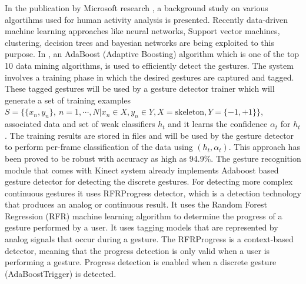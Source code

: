 In the publication by Microsoft research \cite{han2013enhanced}, a background study on various algortihms used for human activity analysis is presented. Recently \cite{KinectSDK2014} data-driven machine learning approaches like neural networks, Support vector machines, clustering, decision trees and bayesian networks are being exploited to this purpose. In \cite{KinectSDK2014}, an AdaBoost (Adaptive Boosting) algorithm \cite{freund1997decision} which is one of the top 10 data mining algorithms, is used to efficiently detect the gestures. The system involves a training phase in which the desired gestures are captured and tagged. These tagged gestures will be used by a gesture detector trainer which will generate a set of training examples $S=\lbrace \lbrace x_n,y_n \rbrace,\ n=1,\cdots,N \vert x_n\in X,y_n\in Y, X=\text{skeleton},Y=\lbrace -1,+1 \rbrace\rbrace$, associated data and set of weak classifiers $h_t$ and it learns the confidence $\alpha_t$ for $h_t$. The training results are stored in files and will be used by the gesture detector to perform per-frame classification of the data using $(h_t,\alpha_t)$. This approach has been proved to be robust with accuracy as high as 94.9\%. The gesture recognition module that comes with Kinect system already implements Adaboost based gesture detector for detecting the discrete gestures. For detecting more complex continuous gestures it uses RFRProgress detector, which is a detection technology that produces an analog or continuous result. It uses the Random Forest Regression (RFR) machine learning algorithm to determine the progress of a gesture performed by a user. It uses tagging models that are represented by analog signals that occur during a gesture. The RFRProgress is a context-based detector, meaning that the progress detection is only valid when a user is performing a gesture. Progress detection is enabled when a discrete gesture (AdaBoostTrigger) is detected.

